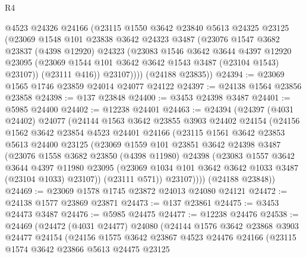 \begin{lexlean}{R4}
\begin{coremodule}
          @4523
          @24326
          @24166
          (@23115
            @1550
            @3642
            @23840
            @5613
            @24325
            @23125
            (@23069
              @1548
              @101
              @23838
              @3642
              @24323
              @3487
              (@23076
                @1547
                @3682
                @23837
                (@4398 @12920)
                @24323
                (@23083
                  @1546
                  @3642
                  @3644
                  @4397
                  @12920
                  @23095
                  (@23069 @1544 @101 @3642 @3642 @1543 @3487 (@23104 @1543) @23107))
                (@23111 @416))
              @23107))))
      (@24188 @23835))
@24394 := @23069 @1565 @1746 @23859 @24014 @24077 @24122
@24397 := @24138 @1564 @23856 @23858
@24398 := @137 @23848
@24400 := @3453 @24398 @3487
@24401 := @5985 @24400
@24402 := @12238 @24401
@24463 := @24394
    (@24397
      (@4031 @24402)
      @24077
      (@24144
        @1563
        @3642
        @23855
        @3903
        @24402
        @24154
        (@24156
          @1562
          @3642
          @23854
          @4523
          @24401
          @24166
          (@23115
            @1561
            @3642
            @23853
            @5613
            @24400
            @23125
            (@23069
              @1559
              @101
              @23851
              @3642
              @24398
              @3487
              (@23076
                @1558
                @3682
                @23850
                (@4398 @11980)
                @24398
                (@23083
                  @1557
                  @3642
                  @3644
                  @4397
                  @11980
                  @23095
                  (@23069 @1034 @101 @3642 @3642 @1033 @3487 (@23104 @1033) @23107))
                (@23111 @571))
              @23107))))
      (@24188 @23848))
@24469 := @23069 @1578 @1745 @23872 @24013 @24080 @24121
@24472 := @24138 @1577 @23869 @23871
@24473 := @137 @23861
@24475 := @3453 @24473 @3487
@24476 := @5985 @24475
@24477 := @12238 @24476
@24538 := @24469
    (@24472
      (@4031 @24477)
      @24080
      (@24144
        @1576
        @3642
        @23868
        @3903
        @24477
        @24154
        (@24156
          @1575
          @3642
          @23867
          @4523
          @24476
          @24166
          (@23115
            @1574
            @3642
            @23866
            @5613
            @24475
            @23125

\end{coremodule}
\end{lexlean}
